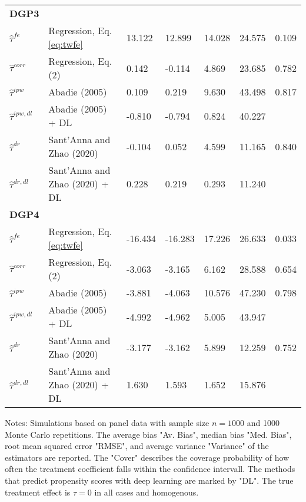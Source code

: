 \begin{table}[htbp]
{\begin{threeparttable}
\begin{tabular}{lllllll}
\addlinespace
\large \textbf{DGP3}            &                                   &            &             &      &           \\
\addlinespace
$\hat{\tau}^{fe}$ & Regression, Eq. \eqref{eq:twfe}               & 13.122       & 12.899       & 14.028 & 24.575 & 0.109    \\
$\hat{\tau}^{corr}$ & Regression, Eq. (2)             & 0.142       & -0.114       & 4.869 & 23.685 &0.782   \\
$\hat{\tau}^{ipw}$ & Abadie (2005)                    & 0.109     & 0.219      & 9.630 & 43.498  & 0.817   \\
$\hat{\tau}^{ipw,dl}$ & Abadie (2005) + DL            & -0.810       & -0.794        & 0.824 & 40.227       \\
$\hat{\tau}^{dr}$ & Sant'Anna and Zhao (2020)         & -0.104       & 0.052        & 4.599 & 11.165  &0.840    \\
$\hat{\tau}^{dr,dl}$ & Sant'Anna and Zhao (2020) + DL & 0.228       & 0.219        & 0.293 & 11.240      \\  \midrule


\addlinespace
\large \textbf{DGP4}            &                                   &            &             &      &           \\
\addlinespace
$\hat{\tau}^{fe}$ & Regression, Eq. \eqref{eq:twfe}              & -16.434       & -16.283        & 17.226 & 26.633  & 0.033   \\
$\hat{\tau}^{corr}$ & Regression, Eq. (2)             & -3.063       & -3.165       & 6.162 & 28.588  &0.654   \\
$\hat{\tau}^{ipw}$ & Abadie (2005)                    & -3.881       & -4.063        & 10.576 & 47.230    & 0.798  \\
$\hat{\tau}^{ipw,dl}$ & Abadie (2005) + DL            & -4.992       & -4.962        & 5.005 & 43.947      \\
$\hat{\tau}^{dr}$ & Sant'Anna and Zhao (2020)         &-3.177      &-3.162       & 5.899 & 12.259  &0.752    \\
$\hat{\tau}^{dr,dl}$ & Sant'Anna and Zhao (2020) + DL & 1.630       & 1.593        & 1.652 & 15.876      \\


\bottomrule
\end{tabular}
\vspace{1em}
\begin{tablenotes}
\item Notes: Simulations based on panel data with sample size $n = 1000$ and 1000 Monte Carlo repetitions. The average bias "Av. Bias", median bias "Med. Bias", root mean squared error "RMSE", and average variance "Variance" of the estimators are reported. The "Cover" describes the coverage probability of how often the treatment coefficient falls within the confidence intervall. The methods that predict propensity scores with deep learning are marked by "DL". The true treatment effect is $\tau = 0$ in all cases and homogenous.
\end{tablenotes}
\end{threeparttable}}
\end{table}

